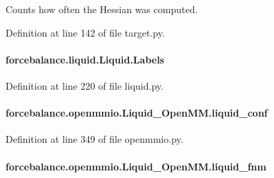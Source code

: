Counts how often the Hessian was computed. 



Definition at line 142 of file target.\-py.

\hypertarget{classforcebalance_1_1liquid_1_1Liquid_a50f976d2d3d6a1c261756035a26390e2}{
\paragraph[{Labels}]{\setlength{\rightskip}{0pt plus 5cm}forcebalance.\-liquid.\-Liquid.\-Labels\hspace{0.3cm}{\ttfamily [inherited]}}}\label{classforcebalance_1_1liquid_1_1Liquid_a50f976d2d3d6a1c261756035a26390e2}


Definition at line 220 of file liquid.\-py.

\hypertarget{classforcebalance_1_1openmmio_1_1Liquid__OpenMM_ad7ba892bf3ec0f986f17ec12e478e977}{
\paragraph[{liquid\-\_\-conf}]{\setlength{\rightskip}{0pt plus 5cm}forcebalance.\-openmmio.\-Liquid\-\_\-\-Open\-M\-M.\-liquid\-\_\-conf}}\label{classforcebalance_1_1openmmio_1_1Liquid__OpenMM_ad7ba892bf3ec0f986f17ec12e478e977}


Definition at line 349 of file openmmio.\-py.

\hypertarget{classforcebalance_1_1openmmio_1_1Liquid__OpenMM_a688bca0f29a2d62deb7fad0a488a7a14}{
\paragraph[{liquid\-\_\-fnm}]{\setlength{\rightskip}{0pt plus 5cm}forcebalance.\-openmmio.\-Liquid\-\_\-\-Open\-M\-M.\-liquid\-\_\-fnm}}\label{classforcebalance_1_1openmmio_1_1Liquid__OpenMM_a688bca0f29a2d62deb7fad0a488a7a14}


